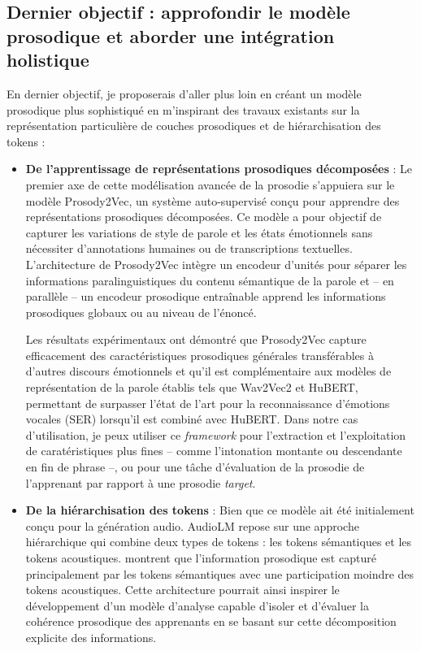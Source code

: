\documentclass[11pt,a4paper]{article}
\begin{document}
\subsection{Dernier objectif : approfondir le modèle prosodique et aborder une intégration holistique}
En dernier objectif, je proposerais d'aller plus loin en créant un modèle prosodique plus sophistiqué en m'inspirant des travaux existants sur la représentation particulière de couches prosodiques et de hiérarchisation des tokens :
\begin{itemize}
    \item \textbf{De l'apprentissage de représentations prosodiques décomposées} \cite{qu2023disentanglingprosodyrepresentationsunsupervised} :
    Le premier axe de cette modélisation avancée de la prosodie s'appuiera sur le modèle Prosody2Vec, un système auto-supervisé conçu pour apprendre des représentations prosodiques décomposées. Ce modèle a pour objectif de capturer les variations de style de parole et les états émotionnels sans nécessiter d'annotations humaines ou de transcriptions textuelles. L'architecture de Prosody2Vec intègre un encodeur d'unités pour séparer les informations paralinguistiques du contenu sémantique de la parole et -- en parallèle -- un encodeur prosodique entraînable apprend les informations prosodiques globaux ou au niveau de l'énoncé. \newline
    
    Les résultats expérimentaux ont démontré que Prosody2Vec capture efficacement des caractéristiques prosodiques générales transférables à d'autres discours émotionnels et qu'il est complémentaire aux modèles de représentation de la parole établis tels que Wav2Vec2 et HuBERT, permettant de surpasser l'état de l'art pour la reconnaissance d'émotions vocales (SER) lorsqu'il est combiné avec HuBERT. \newline
    Dans notre cas d'utilisation, je peux utiliser ce \textit{framework} pour l'extraction et l'exploitation de caratéristiques plus fines -- comme l'intonation montante ou descendante en fin de phrase --, ou pour une tâche d'évaluation de la prosodie de l'apprenant par rapport à une prosodie \textit{target}. \newline

    \item \textbf{De la hiérarchisation des tokens} \cite{borsos2023audiolmlanguagemodelingapproach} : Bien que ce modèle ait été initialement conçu pour la génération audio. AudioLM repose sur une approche hiérarchique qui combine deux types de tokens : les tokens sémantiques et les tokens acoustiques. \cite{borsos2023audiolmlanguagemodelingapproach} montrent que l'information prosodique est capturé principalement par les tokens sémantiques avec une participation moindre des tokens acoustiques. Cette architecture pourrait ainsi inspirer le développement d'un modèle d'analyse capable d'isoler et d'évaluer la cohérence prosodique des apprenants en se basant sur cette décomposition explicite des informations. \newline
\end{itemize}
\end{document}
